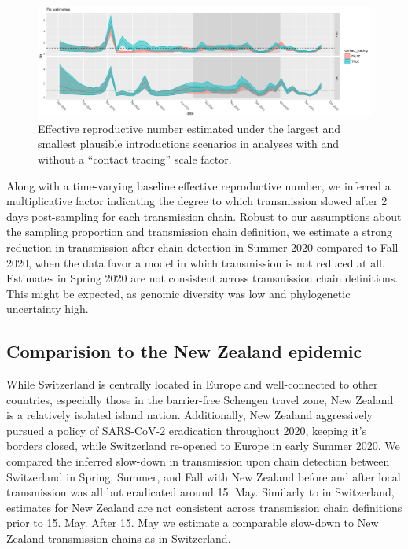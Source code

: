 \documentclass[9pt,twocolumn,twoside,lineno]{pnas-new}
\begin{document}
\begin{figure}[tbhp]
\centering
\includegraphics[width=.8\linewidth]{figures/Re_noSampUB.pdf}
\caption{Effective reproductive number estimated under the largest and smallest plausible introductions scenarios in analyses with and without a ``contact tracing'' scale factor.}  
\label{fig:re}
\end{figure}

Along with a time-varying baseline effective reproductive number, we inferred a multiplicative factor indicating the degree to which transmission slowed after 2 days post-sampling for each transmission chain. Robust to our assumptions about the sampling proportion and transmission chain definition, we estimate a strong reduction in transmission after chain detection in Summer 2020 compared to Fall 2020, when the data favor a model in which transmission is not reduced at all. Estimates in Spring 2020 are not consistent across transmission chain definitions. This might be expected, as genomic diversity was low and phylogenetic uncertainty high.

\subsection{Comparision to the New Zealand epidemic}
While Switzerland is centrally located in Europe and well-connected to other countries, especially those in the barrier-free Schengen travel zone, New Zealand is a relatively isolated island nation. Additionally, New Zealand aggressively pursued a policy of SARS-CoV-2 eradication throughout 2020, keeping it's borders closed, while Switzerland re-opened to Europe in early Summer 2020. We compared the inferred slow-down in transmission upon chain detection between Switzerland in Spring, Summer, and Fall with New Zealand before and after local transmission was all but eradicated around 15. May. Similarly to in Switzerland, estimates for New Zealand are not consistent across transmission chain definitions prior to 15. May. After 15. May we estimate a comparable slow-down to New Zealand transmission chains as in Switzerland. 
\end{document}
